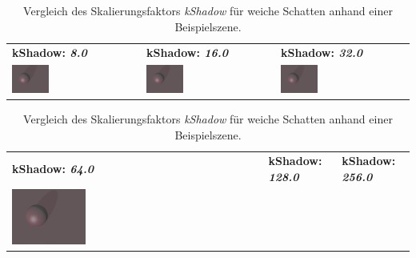 \begin{table}[H]
    \centering
    \caption{Vergleich des Skalierungsfaktors \textit{kShadow} für
        weiche Schatten anhand einer
        Beispielszene.}\label{table:sphere_tracing_shadows}
    \begin{tabular}{p{}p{}p{}}
        \toprule
            \textbf{kShadow: \textit{8.0}} &
            \textbf{kShadow: \textit{16.0}}   &
            \textbf{kShadow: \textit{32.0}}   \\
        \cmidrule(r){1-1}\cmidrule(lr){2-2}\cmidrule(l){3-3}
            \includegraphics[width=0.3\textwidth]{img/sphere_tracing_shadows_8.pdf} \newline &
            \includegraphics[width=0.3\textwidth]{img/sphere_tracing_shadows_16.pdf} \newline &
            \includegraphics[width=0.3\textwidth]{img/sphere_tracing_shadows_32.pdf} \newline \\
        \bottomrule
    \end{tabular}
    \begin{tabular}{p{}p{}p{}}
        \toprule
            \textbf{kShadow: \textit{64.0}} &
            \textbf{kShadow: \textit{128.0}}   &
            \textbf{kShadow: \textit{256.0}}   \\
        \cmidrule(r){1-1}\cmidrule(lr){2-2}\cmidrule(l){3-3}
            \includegraphics[width=0.3\textwidth]{img/sphere_tracing_shadows_64.pdf} \newline &

\end{tabular}
\end{table}

